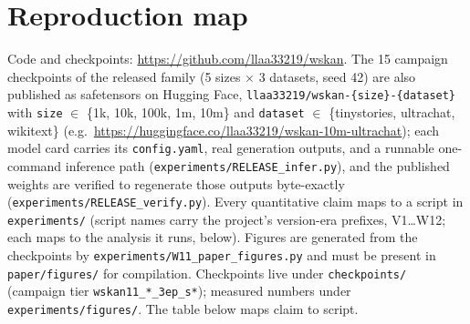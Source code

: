 \documentclass[11pt]{article}
\begin{document}
\section{Reproduction map}

\begin{sloppypar}
Code and checkpoints: \url{https://github.com/llaa33219/wskan}. The 15
campaign checkpoints of the released family (5 sizes $\times$ 3 datasets,
seed 42) are also published as safetensors on Hugging Face,
\texttt{llaa33219/wskan-\{size\}-\{dataset\}} with \texttt{size} $\in$
\{1k, 10k, 100k, 1m, 10m\} and \texttt{dataset} $\in$ \{tinystories,
ultrachat, wikitext\} (e.g.\
\url{https://huggingface.co/llaa33219/wskan-10m-ultrachat}); each model
card carries its \texttt{config.yaml}, real generation outputs, and a
runnable one-command inference path
(\texttt{experiments/RELEASE\_infer.py}), and the published weights are
verified to regenerate those outputs byte-exactly
(\texttt{experiments/RELEASE\_verify.py}). Every
quantitative claim maps to a script in \texttt{experiments/} (script names
carry the project's version-era prefixes, V1\ldots W12; each maps to the
analysis it runs, below). Figures are generated from the checkpoints by
\texttt{experiments/W11\_paper\_figures.py} and must be present in
\texttt{paper/figures/} for compilation. Checkpoints
live under \texttt{checkpoints/} (campaign tier
\texttt{wskan11\_*\_3ep\_s*}); measured numbers under
\texttt{experiments/figures/}. The table below maps claim to script.
\end{sloppypar}
\end{document}
